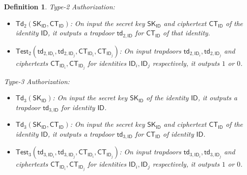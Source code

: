 \documentclass[runningheads,10pt]{llncs}
\newtheorem{defn}[thm]{Definition}
\def\SK{\mathsf{SK}}
\def\CT{\mathsf{CT}}
\def\td{\mathsf{td}}
\def\Td{\mathsf{Td}}
\def\Test{\mathsf{Test}}
\def\ID{\mathsf{ID}}
\begin{document}
\begin{defn}
	Type-2 Authorization:			
	\begin{itemize}
		\item[$\bullet$] $\Td_2(\SK_{\ID}, \CT_{\ID})$: On input the secret key $\SK_{\ID}$ and ciphertext $\CT_{\ID}$ of the identity $\ID$, it outputs a trapdoor $\td_{2,\ID}$ for $\CT_{\ID}$ of that identity.
		\item[$\bullet$] $\Test_2(\td_{2,\ID_i},\td_{2,\ID_j},\CT_{\ID_i},\CT_{\ID_j})$: On input trapdoors $\td_{2,\ID_i}, \td_{2,\ID_j}$ and ciphertexts $\CT_{\ID_i}, \CT_{\ID_j}$ for identities $\ID_i, \ID_j$ respectively, it outputs $1$ or $0$.
	\end{itemize}
	
	Type-3 Authorization:
	\begin{itemize}			
		\item[$\bullet$] $\Td_3(\SK_{\ID})$: On input the secret key $\SK_{\ID}$ of the identity $\ID$, it outputs a trapdoor $\td_{3,\ID}$ for identity $\ID$.
		\item[$\bullet$] $\Td_3(\SK_{\ID}, \CT_{\ID})$: On input the secret key $\SK_{\ID}$ and ciphertext $\CT_{\ID}$ of the identity $\ID$, it outputs a trapdoor $\td_{3,\ID}$ for $\CT_{\ID}$ of identity $\ID$.
		\item[$\bullet$] $\Test_3(\td_{3,\ID_i},\td_{3,\ID_j},\CT_{\ID_i},\CT_{\ID_j})$: On input trapdoors $\td_{3,\ID_i}, \td_{3,\ID_j}$ and ciphertexts $\CT_{\ID_i}, \CT_{\ID_j}$ for identities $\ID_i, \ID_j$ respectively, it outputs $1$ or $0$.
	\end{itemize}    
\end{defn}
\end{document}
